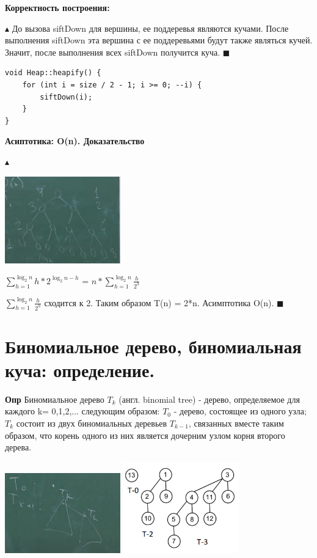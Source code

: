 \textbf{Корректность построения:}

$\blacktriangle$ До вызова siftDown для вершины, ее поддеревья являются кучами. После выполнения siftDown эта вершина с ее поддеревьями будут также являться кучей. Значит, после выполнения всех siftDown получится куча. $\blacksquare$

\begin{lstlisting}
void Heap::heapify() {
    for (int i = size / 2 - 1; i >= 0; --i) {
        siftDown(i);
    }
}
\end{lstlisting}
\textbf{Асиптотика: O(n). Доказательство}

$\blacktriangle$

\includegraphics[width=5cm]{images/25}
 
  $\displaystyle\sum_{h=1}^{\log_{2}{n}} h*2^{\log_{2}{n} - h}$ = $n*\displaystyle\sum_{h=1}^{\log_{2}{n}} \frac{h}{2^h}$
 
 $\displaystyle\sum_{h=1}^{\log_{2}{n}} \frac{h}{2^h}$ сходится к 2. 
 Таким образом T(n) = 2*n. Асимптотика O(n).
 $\blacksquare$


\section{Биномиальное дерево, биномиальная куча: определение.}

\textbf{Опр} Биномиальное дерево $T_{k}$ (англ. binomial tree) - дерево, определяемое для каждого k= 0,1,2,... следующим образом: $T_{0}$ - дерево, состоящее из одного узла; $T_{k}$ состоит из двух биномиальных деревьев $T_{k-1}$, связанных вместе таким образом, что корень одного из них является дочерним узлом корня второго дерева.

\includegraphics[width=5cm]{images/26_1}
\includegraphics[width=5cm]{images/26_2}

